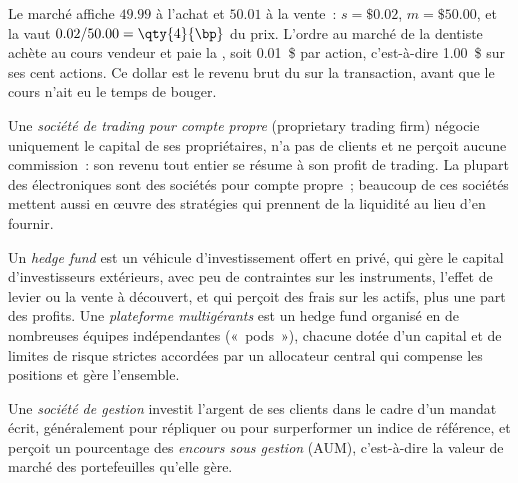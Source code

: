 \begin{example}\label{ex:m1:what-a-trading-firm-does:dentist}
Le marché affiche $49.99$ à l'achat et $50.01$ à la vente~: $s = \$0.02$, $m = \$50.00$, et la
 vaut $0.02/50.00 = \qty{4}{\bp}$ du prix. L'ordre au marché de la dentiste
achète au cours vendeur et paie la , soit 0.01~\$ par action, c'est-à-dire
1.00~\$ sur ses cent actions. Ce dollar est le revenu brut du 
sur la transaction, avant que le cours n'ait eu le temps de bouger.
\end{example}

\begin{definition}\label{def:m1:what-a-trading-firm-does:prop}
Une \emph{société de trading pour compte propre} (proprietary trading firm) négocie
uniquement le capital de ses propriétaires, n'a pas de clients et ne perçoit aucune commission~:
son revenu tout entier se résume à son profit de trading. La plupart des 
électroniques sont des sociétés pour compte propre~; beaucoup de ces sociétés mettent aussi en œuvre
des stratégies qui prennent de la liquidité au lieu d'en fournir.
\end{definition}

\begin{definition}\label{def:m1:what-a-trading-firm-does:hedge-fund}
Un \emph{hedge fund} est un véhicule d'investissement offert en privé, qui gère
le capital d'investisseurs extérieurs, avec peu de contraintes sur les instruments,
l'effet de levier ou la vente à découvert, et qui perçoit des frais sur les actifs, plus
une part des profits. Une \emph{plateforme multigérants}
est un hedge fund organisé en de nombreuses équipes indépendantes («~pods~»), chacune dotée
d'un capital et de limites de risque strictes accordées par un allocateur central qui
compense les positions et gère l'ensemble.
\end{definition}

\begin{definition}\label{def:m1:what-a-trading-firm-does:asset-manager}
Une \emph{société de gestion} investit l'argent de ses clients dans le cadre
d'un mandat écrit, généralement pour répliquer ou pour surperformer un indice de référence, et perçoit
un pourcentage des \emph{encours sous gestion}
(AUM), c'est-à-dire la valeur de marché des portefeuilles qu'elle gère.
\end{definition}

